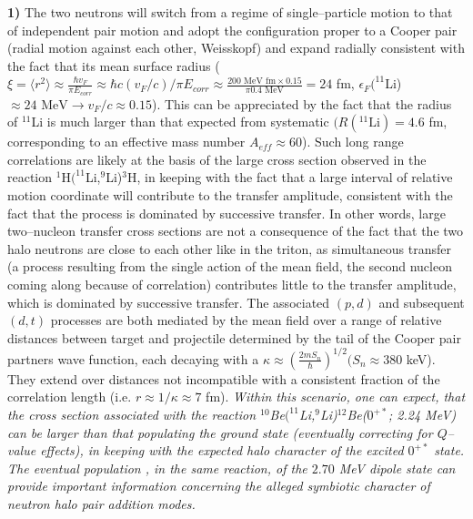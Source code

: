\begin{subappendices}
    
\textbf{1)} The two neutrons will switch from a regime of single--particle motion to that of independent pair motion and adopt the configuration proper to a Cooper pair (radial motion against each other, Weisskopf) and expand radially consistent with the fact that its mean surface radius ($\xi=\langle r^2\rangle\approx\frac{\hbar v_F}{\pi E_{corr}}\approx \hbar c(v_F/c)/\pi E_{corr}\approx\frac{200\text{ MeV fm}\times 0.15}{\pi 0.4\text{ MeV}}=24$ fm, $\epsilon_F(^{11}$Li)$\approx 24\text{ MeV}\rightarrow v_F/c\approx 0.15$). This can be appreciated by the fact that the radius of $^{11}$Li is much larger than that expected from systematic $(R(^{11}\text{Li})=4.6 $ fm, corresponding to an effective mass number $A_{eff}\approx60$).
    	Such long range correlations are likely at the basis of the large cross section observed in the reaction $^1$H$(^{11}$Li,$^9$Li)$^3$H, in keeping with the fact that a large interval of relative motion coordinate will contribute to the transfer amplitude, consistent with the fact that the process is dominated by successive transfer. In other words, large two--nucleon transfer cross sections are not a consequence of the fact that the two halo neutrons are close to each other like in the triton, as simultaneous transfer (a process resulting from the single action of the mean field, the second nucleon coming along because of correlation) contributes little to the transfer amplitude, which is dominated by successive transfer. The associated $(p,d)$ and subsequent $(d,t)$ processes are both mediated by the mean field over a range of relative distances between target and projectile determined by the tail of the Cooper pair partners wave function, each decaying with a $\kappa\approx\left(\frac{2mS_n}{\hbar}\right)^{1/2} (S_n\approx 380 $ keV). They extend over distances not incompatible with a consistent fraction of the correlation length (i.e. $r\approx1/\kappa\approx 7$ fm).
    	\textit{Within this scenario, one can expect, that the cross section associated with the reaction $^{10}$Be$(^{11}$Li,$^9$Li)$^{12}$Be($0^{+*}$; 2.24 MeV) can be larger than that populating the ground state (eventually correcting for $Q$--value effects), in keeping with the expected halo character of the excited $0^{+*}$ state. The eventual population , in the same reaction, of the $2.70$ MeV dipole state can provide important information concerning the alleged symbiotic character of neutron halo pair addition modes.}	
    	

\end{subappendices}
